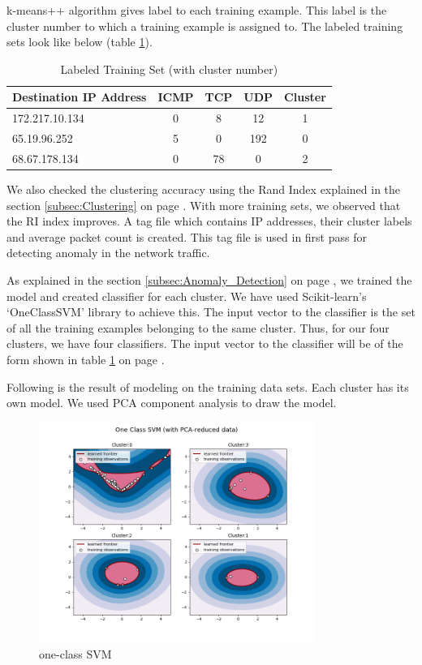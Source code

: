 \documentclass[12pt,oneside,a4paper]{article}
\begin{document}
k-means++ algorithm gives label to each training example. This label is the cluster number to which a training example is assigned to. The labeled training sets look like below (table \ref{table:labeled-set}).

\begin{table}[H]
\centering
  \begin{tabular}{| l | c | c | c | c |}
    \hline
    {Destination IP Address}  &ICMP  &TCP &UDP  &Cluster \\
    \hline
    172.217.10.134  & 0     & 8     & 12  &1  \\ \hline
    65.19.96.252    & 5     & 0     & 192 &0  \\ \hline
    68.67.178.134   & 0     & 78    & 0   &2  \\ \hline
  \end{tabular}
\caption{Labeled Training Set (with cluster number)} \label{table:labeled-set}
\end{table}

We also checked the clustering accuracy using the Rand Index explained in the section \ref{subsec:Clustering} on page \pageref{subsec:Clustering}. With more training sets, we observed that the RI index improves. A tag file which contains IP addresses, their cluster labels and average packet count is created. This tag file is used in first pass for detecting anomaly in the network traffic.

As explained in the section \ref{subsec:Anomaly_Detection} on page \pageref{subsec:Anomaly_Detection}, we trained the model and created classifier for each cluster. We have used Scikit-learn's `OneClassSVM' library to achieve this. The input vector to the classifier is the set of all the training examples belonging to the same cluster. Thus, for our four clusters, we have four classifiers. The input vector to the classifier will be of the form shown in table \ref{table:labeled-set} on page \pageref{table:labeled-set}.

Following is the result of modeling on the training data sets. Each cluster has its own model. We used PCA component analysis to draw the model.

\begin{figure}[H]
\centering
\includegraphics[width=0.80\textwidth]{one-class-SVM.png}
\caption{one-class SVM} \label{fig:one-class-SVM}
\end{figure}
\end{document}
